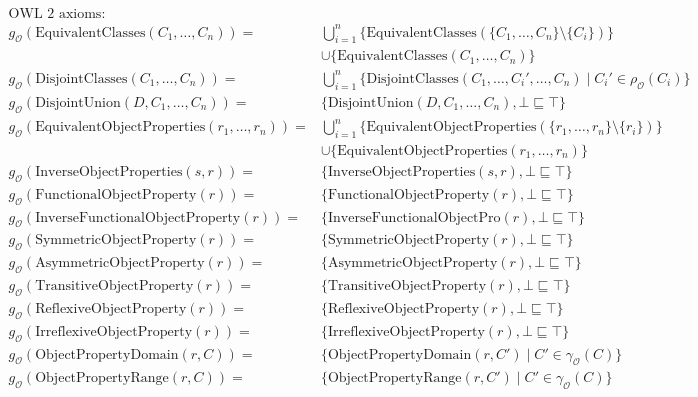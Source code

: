 \begin{align*}
    \text{OWL 2 axioms:} \quad & \\
    g_\mathcal{O}(\mathrm{EquivalentClasses}(C_1, \dots, C_n)) =& \bigcup_{i=1}^n \{ \mathrm{EquivalentClasses}(\{C_1, \dots, C_n\} \setminus \{C_i\}) \} \\& \cup \{ \mathrm{EquivalentClasses}(C_1, \dots, C_n) \} \\
    g_\mathcal{O}(\mathrm{DisjointClasses}(C_1, \dots, C_n)) =& \bigcup_{i=1}^n \{ \mathrm{DisjointClasses}(C_1, \dots, C_i', \dots, C_n) \mid C_i' \in \rho_\mathcal{O}(C_i) \} \\
    g_\mathcal{O}(\mathrm{DisjointUnion}(D, C_1, \dots, C_n)) =& \{ \mathrm{DisjointUnion}(D, C_1, \dots, C_n), \bot \sqsubseteq \top \} \\
    g_\mathcal{O}(\mathrm{EquivalentObjectProperties}(r_1, \dots, r_n)) =& \bigcup_{i=1}^n \{ \mathrm{EquivalentObjectProperties}(\{r_1, \dots, r_n\} \setminus \{r_i\}) \} \\& \cup \{ \mathrm{EquivalentObjectProperties}(r_1, \dots, r_n) \} \\
    g_\mathcal{O}(\mathrm{InverseObjectProperties}(s, r)) ={} & \{ \mathrm{InverseObjectProperties}(s, r), \bot \sqsubseteq \top \} \\
    g_\mathcal{O}(\mathrm{FunctionalObjectProperty}(r)) ={} & \{ \mathrm{FunctionalObjectProperty}(r), \bot \sqsubseteq \top \} \\
    g_\mathcal{O}(\mathrm{InverseFunctionalObjectProperty}(r)) ={} & \{ \mathrm{InverseFunctionalObjectPro}(r), \bot \sqsubseteq \top \} \\
    g_\mathcal{O}(\mathrm{SymmetricObjectProperty}(r)) ={} & \{ \mathrm{SymmetricObjectProperty}(r), \bot \sqsubseteq \top \} \\
    g_\mathcal{O}(\mathrm{AsymmetricObjectProperty}(r)) ={} & \{ \mathrm{AsymmetricObjectProperty}(r), \bot \sqsubseteq \top \} \\
    g_\mathcal{O}(\mathrm{TransitiveObjectProperty}(r)) ={} & \{ \mathrm{TransitiveObjectProperty}(r), \bot \sqsubseteq \top \} \\
    g_\mathcal{O}(\mathrm{ReflexiveObjectProperty}(r)) ={} & \{ \mathrm{ReflexiveObjectProperty}(r), \bot \sqsubseteq \top \} \\
    g_\mathcal{O}(\mathrm{IrreflexiveObjectProperty}(r)) ={} & \{ \mathrm{IrreflexiveObjectProperty}(r), \bot \sqsubseteq \top \} \\
    g_\mathcal{O}(\mathrm{ObjectPropertyDomain}(r, C)) ={} & \{\mathrm{ObjectPropertyDomain}(r, C') \mid C' \in \gamma_\mathcal{O}  (C)\} \\
    g_\mathcal{O}(\mathrm{ObjectPropertyRange}(r, C)) ={} & \{\mathrm{ObjectPropertyRange}(r, C') \mid C' \in \gamma_\mathcal{O}  (C)\}
\end{align*}
\endgroup
